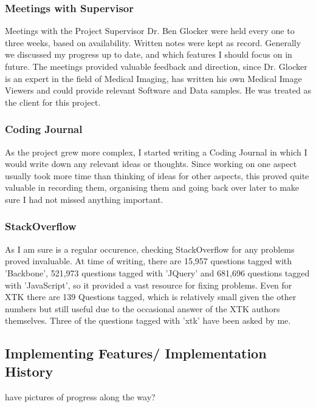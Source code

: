 \documentclass[a4paper,11pt,titlepage]{article}
\begin{document}
\subsubsection{Meetings with Supervisor}

Meetings with the Project Supervisor Dr. Ben Glocker were held every one to three weeks, based on availability. Written notes were kept as record. Generally we discussed my progress up to date, and which features I should focus on in future. The meetings provided valuable feedback and direction, since Dr. Glocker is an expert in the field of Medical Imaging, has written his own Medical Image Viewers and could provide relevant Software and Data samples. He was treated as the client for this project.

\subsubsection{Coding Journal}

As the project grew more complex, I started writing a Coding Journal in which I would write down any relevant ideas or thoughts. Since working on one aspect usually took more time than thinking of ideas for other aspects, this proved quite valuable in recording them, organising them and going back over later to make sure I had not missed anything important.

\subsubsection{StackOverflow}

As I am sure is a regular occurence, checking StackOverflow for any problems proved invaluable. At time of writing, there are 15,957 questions tagged with 'Backbone', 521,973 questions tagged with 'JQuery' and 681,696 questions tagged with 'JavaScript', so it provided a vast resource for fixing problems. Even for XTK there are 139 Questions tagged, which is relatively small given the other numbers but still useful due to the occasional answer of the XTK authors themselves. Three of the questions tagged with 'xtk' have been asked by me.






\subsection{Implementing Features/ Implementation History}

have pictures of progress along the way?
\end{document}
